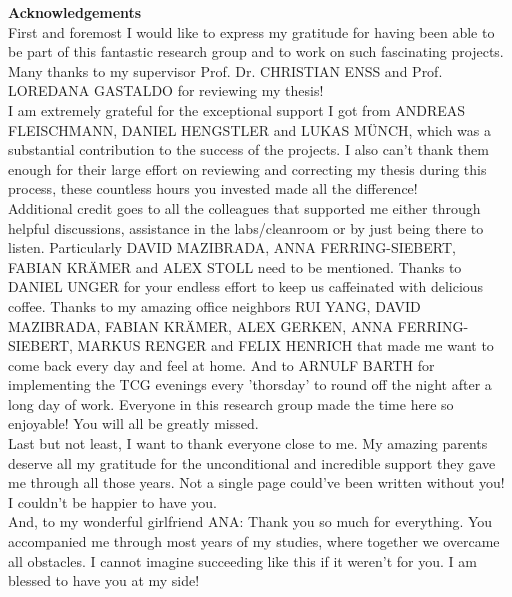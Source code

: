 %


{\Large \bf Acknowledgements} \\

First and foremost I would like to express my gratitude for having been able to be part of this fantastic research group and to work on such fascinating projects. Many thanks to my supervisor Prof. Dr. CHRISTIAN ENSS and Prof. LOREDANA GASTALDO for reviewing my thesis! \\ 

\noindent I am extremely grateful for the exceptional support I got from ANDREAS FLEISCHMANN, DANIEL HENGSTLER and LUKAS MÜNCH, which was a substantial contribution to the success of the projects. I also can't thank them enough for their large effort on reviewing and correcting my thesis during this process, these countless hours you invested made all the difference! \\ 

\noindent Additional credit goes to all the colleagues that supported me either through helpful discussions, assistance in the labs/cleanroom or by just being there to listen.  Particularly DAVID MAZIBRADA, ANNA FERRING-SIEBERT, FABIAN KRÄMER and ALEX STOLL need to be mentioned. Thanks to DANIEL UNGER for your endless effort to keep us caffeinated with delicious coffee. Thanks to my amazing office neighbors RUI YANG, DAVID MAZIBRADA, FABIAN KRÄMER, ALEX GERKEN, ANNA FERRING-SIEBERT, MARKUS RENGER and FELIX HENRICH that made me want to come back every day and feel at home. And to ARNULF BARTH for implementing the TCG evenings every 'thorsday' to round off the night after a long day of work. Everyone in this research group made the time here so enjoyable! You will all be greatly missed. \\

\noindent Last but not least, I want to thank everyone close to me. My amazing parents deserve all my gratitude for the unconditional and incredible support they gave me through all those years. Not a single page could've been written without you! I couldn't be happier to have you. \\ And, to my wonderful girlfriend ANA: Thank you so much for everything. You accompanied me through most years of my studies, where together we overcame all obstacles. I cannot imagine succeeding like this if it weren't for you. I am blessed to have you at my side!


%